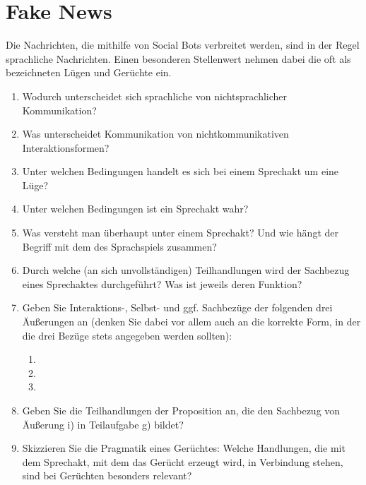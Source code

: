 \chapter{Fake News}
\label{ch:02_fake-news}

\begin{universityTask}
    Die Nachrichten, die mithilfe von Social Bots verbreitet werden, sind in der Regel sprachliche Nachrichten. Einen besonderen Stellenwert nehmen dabei die oft als  bezeichneten Lügen und Gerüchte ein.

    \vspace{0.5cm}

    \begin{enumerate}[label=(\alph*)]
        \item Wodurch unterscheidet sich sprachliche von nichtsprachlicher Kommunikation?
        \item Was unterscheidet Kommunikation von nichtkommunikativen Interaktionsformen?
        \item Unter welchen Bedingungen handelt es sich bei einem Sprechakt um eine Lüge?
        \item Unter welchen Bedingungen ist ein Sprechakt wahr?
        \item Was versteht man überhaupt unter einem Sprechakt? Und wie hängt der Begriff mit dem des Sprachspiels zusammen?
        \item Durch welche (an sich unvollständigen) Teilhandlungen wird der Sachbezug eines Sprechaktes durchgeführt? Was ist jeweils deren Funktion?
        \item Geben Sie Interaktions-, Selbst- und ggf. Sachbezüge der folgenden drei Äußerungen an (denken Sie dabei vor allem auch an die korrekte Form, in der die drei Bezüge stets angegeben werden sollten):
        \begin{enumerate}[label=\roman*.]
            \item {}
            \item {}
            \item {}
        \end{enumerate}
        \item Geben Sie die Teilhandlungen der Proposition an, die den Sachbezug von Äußerung i) in Teilaufgabe g) bildet?
        \pagebreak
        \item Skizzieren Sie die Pragmatik eines Gerüchtes: Welche Handlungen, die mit dem Sprechakt, mit dem das Gerücht erzeugt wird, in Verbindung stehen, sind bei Gerüchten besonders relevant?
    \end{enumerate}
\end{universityTask}

